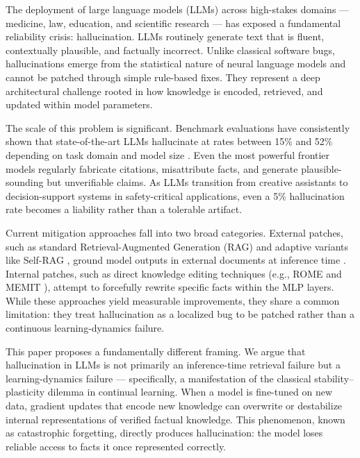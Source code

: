 \documentclass[10pt, conference, letterpaper]{IEEEtran}
\begin{document}
The deployment of large language models (LLMs) across high-stakes domains --- medicine, law, education, and scientific research --- has exposed a fundamental reliability crisis: hallucination. LLMs routinely generate text that is fluent, contextually plausible, and factually incorrect. Unlike classical software bugs, hallucinations emerge from the statistical nature of neural language models and cannot be patched through simple rule-based fixes. They represent a deep architectural challenge rooted in how knowledge is encoded, retrieved, and updated within model parameters.

The scale of this problem is significant. Benchmark evaluations have consistently shown that state-of-the-art LLMs hallucinate at rates between 15\% and 52\% depending on task domain and model size \cite{ji2023survey, maynez2020faithfulness, xu2024hallucination}. Even the most powerful frontier models regularly fabricate citations, misattribute facts, and generate plausible-sounding but unverifiable claims. As LLMs transition from creative assistants to decision-support systems in safety-critical applications, even a 5\% hallucination rate becomes a liability rather than a tolerable artifact.

Current mitigation approaches fall into two broad categories. External patches, such as standard Retrieval-Augmented Generation (RAG) and adaptive variants like Self-RAG \cite{asai2023self}, ground model outputs in external documents at inference time \cite{gao2024rag}. Internal patches, such as direct knowledge editing techniques (e.g., ROME \cite{meng2022locating} and MEMIT \cite{meng2022mass}), attempt to forcefully rewrite specific facts within the MLP layers. While these approaches yield measurable improvements, they share a common limitation: they treat hallucination as a localized bug to be patched rather than a continuous learning-dynamics failure.

This paper proposes a fundamentally different framing. We argue that hallucination in LLMs is not primarily an inference-time retrieval failure but a learning-dynamics failure --- specifically, a manifestation of the classical stability--plasticity dilemma in continual learning. When a model is fine-tuned on new data, gradient updates that encode new knowledge can overwrite or destabilize internal representations of verified factual knowledge. This phenomenon, known as catastrophic forgetting, directly produces hallucination: the model loses reliable access to facts it once represented correctly.
\end{document}
